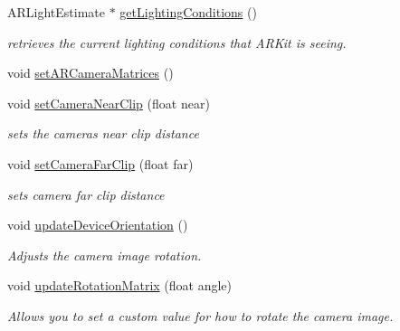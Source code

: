 \begin{DoxyCompactItemize}
\mbox{\label{class_a_r_core_1_1_a_r_cam_ad11f88524d97445892956def3864523e}} 
A\+R\+Light\+Estimate $\ast$ \hyperlink{class_a_r_core_1_1_a_r_cam_ad11f88524d97445892956def3864523e}{get\+Lighting\+Conditions} ()
\begin{DoxyCompactList}\small\item\em retrieves the current lighting conditions that A\+R\+Kit is seeing. \end{DoxyCompactList}\item 
void \hyperlink{class_a_r_core_1_1_a_r_cam_ac554b8254ea4a22f122f25542694dafa}{set\+A\+R\+Camera\+Matrices} ()
\item 
\mbox{\label{class_a_r_core_1_1_a_r_cam_a040d67ba6abb95e914760ca6e64ac664}} 
void \hyperlink{class_a_r_core_1_1_a_r_cam_a040d67ba6abb95e914760ca6e64ac664}{set\+Camera\+Near\+Clip} (float near)
\begin{DoxyCompactList}\small\item\em sets the camera\textquotesingle{}s near clip distance \end{DoxyCompactList}\item 
\mbox{\label{class_a_r_core_1_1_a_r_cam_aa29191b58c0e6613850916526c6ab380}} 
void \hyperlink{class_a_r_core_1_1_a_r_cam_aa29191b58c0e6613850916526c6ab380}{set\+Camera\+Far\+Clip} (float far)
\begin{DoxyCompactList}\small\item\em sets camera far clip distance \end{DoxyCompactList}\item 
\mbox{\label{class_a_r_core_1_1_a_r_cam_a0c910d5c7f637ce2820132255dfb67f7}} 
void \hyperlink{class_a_r_core_1_1_a_r_cam_a0c910d5c7f637ce2820132255dfb67f7}{update\+Device\+Orientation} ()
\begin{DoxyCompactList}\small\item\em Adjusts the camera image rotation. \end{DoxyCompactList}\item 
\mbox{\label{class_a_r_core_1_1_a_r_cam_a1813b2b0f2665741173228ffff518d67}} 
void \hyperlink{class_a_r_core_1_1_a_r_cam_a1813b2b0f2665741173228ffff518d67}{update\+Rotation\+Matrix} (float angle)
\begin{DoxyCompactList}\small\item\em Allows you to set a custom value for how to rotate the camera image. \end{DoxyCompactList}\item 

\end{DoxyCompactItemize}
